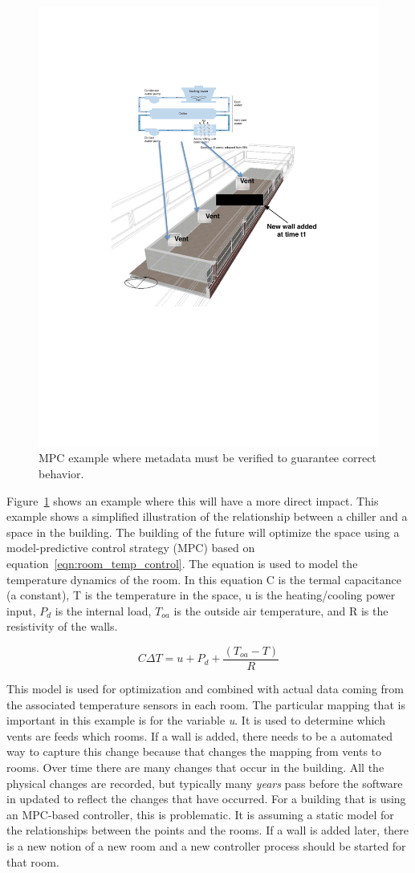\begin{figure}[h!] %
\centering
\includegraphics[width=0.5\columnwidth]{figs/mpc_example}
\caption{MPC example where metadata must be verified to guarantee correct behavior.}
\label{fig:mpc_example}
\end{figure}

Figure~\ref{fig:mpc_example} shows an example where this will have a more direct impact.  This example shows a simplified illustration
of the relationship between a chiller and a space in the building.  The building of the future will optimize the space using a 
model-predictive control strategy (MPC) based on equation~\ref{eqn:room_temp_control}.  The equation is used to model the temperature
dynamics of the room.  In this equation C is the termal capacitance (a constant), T is the temperature in the space, u is the heating/cooling
power input, $P_{d}$ is the internal load, $T_{oa}$ is the outside air temperature, and R is the resistivity of the walls.


\begin{equation}
\label{eqn:room_temp_control}
C \Delta T = u + P_d + \frac{(T_{oa} - T)}{R}
\end{equation}

This model is used for optimization and combined with actual data coming from the associated temperature sensors in each room.
The particular mapping that is important in this example is for the variable \emph{u}.  It is used to determine
which vents are feeds which rooms.  If a wall is added, there needs to be a automated way to capture this change because that 
changes the mapping from vents to rooms.
Over time there are many changes that occur in the building.
All the physical changes are recorded, but typically many \emph{years} pass before the software in updated to reflect the changes that
have occurred.  For a building that is using an MPC-based controller, this is problematic.  It is assuming a static model for the relationships
between the points and the rooms.  If a wall is added later, there is a new notion of a new room and a new controller process should be 
started for that room.

